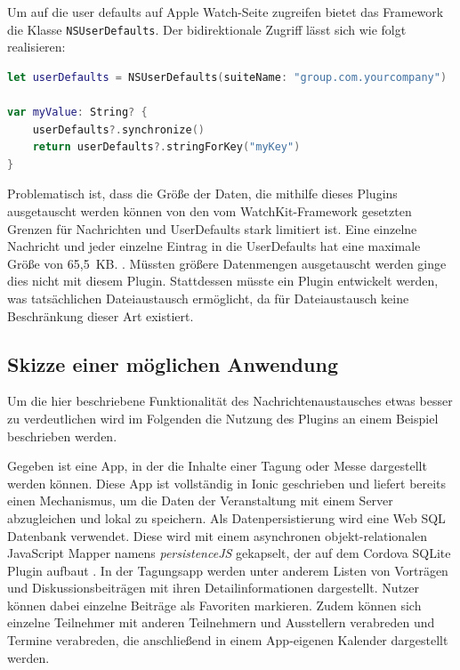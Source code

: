 Um auf die user defaults auf Apple Watch-Seite zugreifen bietet das Framework die Klasse \texttt{NSUserDefaults}. Der bidirektionale Zugriff lässt sich wie folgt realisieren:
\begin{lstlisting}[language=swift, breaklines=true]
let userDefaults = NSUserDefaults(suiteName: "group.com.yourcompany")

var myValue: String? {
    userDefaults?.synchronize()
    return userDefaults?.stringForKey("myKey")
}
\end{lstlisting}
%
Problematisch ist, dass die Größe der Daten, die mithilfe dieses Plugins ausgetauscht werden können von den vom WatchKit-Framework gesetzten Grenzen für Nachrichten und UserDefaults stark limitiert ist. Eine einzelne Nachricht und jeder einzelne Eintrag in die UserDefaults hat eine maximale Größe von 65,5~KB. \cite{appleWatchPayloadMaximumDatatransfer}. Müssten größere Datenmengen ausgetauscht werden ginge dies nicht mit diesem Plugin. Stattdessen müsste ein Plugin entwickelt werden, was tatsächlichen Dateiaustausch ermöglicht, da für Dateiaustausch keine Beschränkung dieser Art existiert.
%
%
\subsection{Skizze einer möglichen Anwendung}
%
Um die hier beschriebene Funktionalität des Nachrichtenaustausches etwas besser zu verdeutlichen wird im Folgenden die Nutzung des Plugins an einem Beispiel beschrieben werden.

Gegeben ist eine App, in der die Inhalte einer Tagung oder Messe dargestellt werden können. Diese App ist vollständig in Ionic geschrieben und liefert bereits einen Mechanismus, um die Daten der Veranstaltung mit einem Server abzugleichen und lokal zu speichern. Als Datenpersistierung wird eine Web SQL Datenbank verwendet. Diese wird mit einem asynchronen objekt-relationalen JavaScript Mapper namens \emph{persistenceJS} gekapselt, der auf dem Cordova SQLite Plugin aufbaut \cite{persistenceJSDoku}. In der Tagungsapp werden unter anderem Listen von Vorträgen und Diskussionsbeiträgen mit ihren Detailinformationen dargestellt. Nutzer können dabei einzelne Beiträge als Favoriten markieren. Zudem können sich einzelne Teilnehmer mit anderen Teilnehmern und Ausstellern verabreden und Termine verabreden, die anschließend in einem App-eigenen Kalender dargestellt werden.

